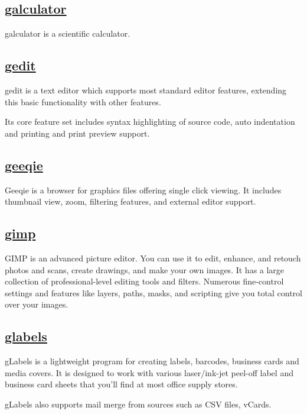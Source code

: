 \subsection{\href{http://galculator.sourceforge.net/}{galculator}}

 galculator is a scientific calculator.

\subsection{\href{https://wiki.gnome.org/Apps/Gedit}{gedit}}

 gedit is a text editor which supports most standard editor features,
 extending this basic functionality with other features.
 
 Its core feature set includes syntax
 highlighting of source code, auto indentation and printing and print preview
 support.
 
\subsection{\href{http://geeqie.sourceforge.net/}{geeqie}}

 Geeqie is a browser for graphics files offering single click viewing.
 It includes thumbnail view, zoom, filtering
 features, and external editor support.

\subsection{\href{http://www.gimp.org/}{gimp}}

 GIMP is an advanced picture editor. You can use it to edit, enhance, and
 retouch photos and scans, create drawings, and make your own images.
 It has a large collection of professional-level editing tools and
 filters. Numerous
 fine-control settings and features like layers, paths, masks, and
 scripting give you total control over your images.
 
\subsection{\href{http://glabels.sourceforge.net/}{glabels}}

 gLabels is a lightweight program for creating labels, barcodes, business
 cards and media covers. It is designed to
 work with various laser/ink-jet peel-off label and business card sheets that
 you'll find at most office supply stores.
 
 gLabels also supports mail merge from sources such as CSV files, vCards.

